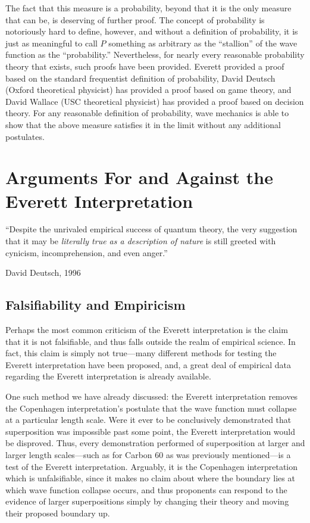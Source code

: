 \documentclass[
    12pt,
    letterpaper,
    aps,
    prd,
    longbibliography,
    twocolumn,
    nofootinbib,
    raggedbottom,
    amsmath,
    amssymb,
    amsfonts,
]{revtex4-1}
\begin{document}
The fact that this measure is a probability, beyond that it is the only measure that can be, is deserving of further proof. The concept of probability is notoriously hard to define, however, and without a definition of probability, it is just as meaningful to call $P$ something as arbitrary as the ``stallion'' of the wave function as the ``probability.'' Nevertheless, for nearly every reasonable probability theory that exists, such proofs have been provided. Everett provided a proof based on the standard frequentist definition of probability\cite{everett}\cite{relativestate}, David Deutsch (Oxford theoretical physicist) has provided a proof based on game theory\cite{bornproof1}, and David Wallace (USC theoretical physicist) has provided a proof based on decision theory\cite{bornproof2}. For any reasonable definition of probability, wave mechanics is able to show that the above measure satisfies it in the limit without any additional postulates.\cite{bornproof3}\cite{bornproof2summary}\cite{chris}

\section{Arguments For and Against the Everett Interpretation}
\label{sec:args}

\epigraph{``Despite the unrivaled empirical success of quantum theory, the very suggestion that it may be \textit{literally true as a description of nature} is still greeted with cynicism, incomprehension, and even anger.''\cite{everetttaboo}}{David Deutsch, 1996}

\subsection{Falsifiability and Empiricism}

Perhaps the most common criticism of the Everett interpretation is the claim that it is not falsifiable, and thus falls outside the realm of empirical science.\cite{carolltestable} In fact, this claim is simply not true---many different methods for testing the Everett interpretation have been proposed, and, a great deal of empirical data regarding the Everett interpretation is already available.

One such method we have already discussed: the Everett interpretation removes the Copenhagen interpretation's postulate that the wave function must collapse at a particular length scale. Were it ever to be conclusively demonstrated that superposition was impossible past some point, the Everett interpretation would be disproved. Thus, every demonstration performed of superposition at larger and larger length scales---such as for Carbon 60 as was previously mentioned\cite{buckyballs}---is a test of the Everett interpretation. Arguably, it is the Copenhagen interpretation which is unfalsifiable, since it makes no claim about where the boundary lies at which wave function collapse occurs, and thus proponents can respond to the evidence of larger superpositions simply by changing their theory and moving their proposed boundary up.
\end{document}
